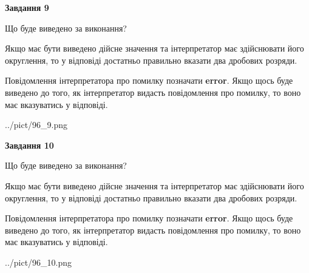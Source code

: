 \documentclass[12pt, ukrainian]{article}
\begin{document}
{\begin {Large}
{\begin {center}\textbf{Завдання 9}\end {center}}\par
Що буде виведено за виконання? \par

Якщо має бути виведено дійсне значення та інтерпретатор має здійснювати його округлення, 
то у відповіді достатньо правильно вказати два дробових розряди.

Повідомлення інтерпретатора про помилку позначати \textbf{error}.
Якщо щось буде виведено до того, як інтерпретатор видасть повідомлення про помилку, 
то воно має вказуватись у відповіді. \par

\begin{center}
	{../pict/96_9.png}
\end{center}
\newpage

{\begin {center}\textbf{Завдання 10}\end {center}}\par
Що буде виведено за виконання? \par

Якщо має бути виведено дійсне значення та інтерпретатор має здійснювати його округлення, 
то у відповіді достатньо правильно вказати два дробових розряди.

Повідомлення інтерпретатора про помилку позначати \textbf{error}.
Якщо щось буде виведено до того, як інтерпретатор видасть повідомлення про помилку, 
то воно має вказуватись у відповіді. \par

\begin{center}
	{../pict/96_10.png}
\end{center}
\newpage

\end {Large}}
\end{document}
